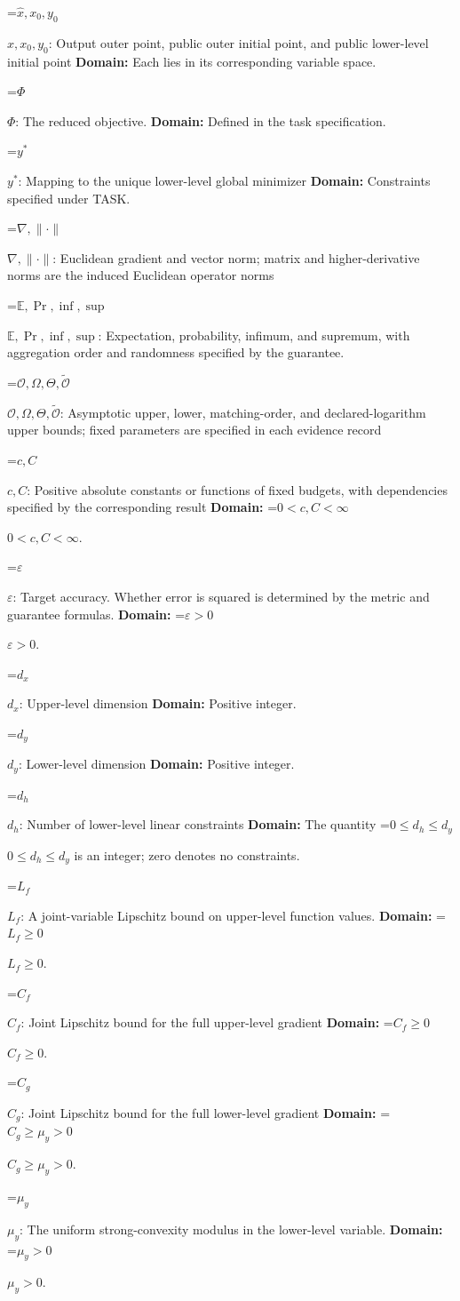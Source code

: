 \documentclass[10pt,a4paper]{article}
\newcommand{\AtlasMath}[1]{\par\begingroup\centering\setbox0=\hbox{$\displaystyle #1$}\ifdim\wd0>1.4\linewidth\typeout{ATLAS WIDE FORMULA: \the\wd0}\fi\ifdim\wd0>\linewidth\resizebox{\linewidth}{!}{\box0}\else\box0\fi\par\endgroup}
\newcommand{\AtlasInlineMath}[1]{\begingroup\setbox0=\hbox{$#1$}\ifdim\wd0>.4\linewidth\endgroup\AtlasMath{#1}\else\endgroup$#1$\fi}
\begin{document}
\AtlasInlineMath{\widehat x,x_0,y_0}: Output outer point, public outer initial point, and public lower-level initial point \textbf{Domain:} Each lies in its corresponding variable space.

\AtlasInlineMath{\Phi}: The reduced objective. \textbf{Domain:} Defined in the task specification.

\AtlasInlineMath{y^*}: Mapping to the unique lower-level global minimizer \textbf{Domain:} Constraints specified under TASK.

\AtlasInlineMath{\nabla,\|\cdot\|}: Euclidean gradient and vector norm; matrix and higher-derivative norms are the induced Euclidean operator norms

\AtlasInlineMath{\mathbb E,\Pr,\inf,\sup}: Expectation, probability, infimum, and supremum, with aggregation order and randomness specified by the guarantee.

\AtlasInlineMath{\mathcal O,\Omega,\Theta,\widetilde{\mathcal O}}: Asymptotic upper, lower, matching-order, and declared-logarithm upper bounds; fixed parameters are specified in each evidence record

\AtlasInlineMath{c,C}: Positive absolute constants or functions of fixed budgets, with dependencies specified by the corresponding result \textbf{Domain:} \AtlasInlineMath{0<c,C<\infty}.

\AtlasInlineMath{\varepsilon}: Target accuracy. Whether error is squared is determined by the metric and guarantee formulas. \textbf{Domain:} \AtlasInlineMath{\varepsilon>0}.

\AtlasInlineMath{d_x}: Upper-level dimension \textbf{Domain:} Positive integer.

\AtlasInlineMath{d_y}: Lower-level dimension \textbf{Domain:} Positive integer.

\AtlasInlineMath{d_h}: Number of lower-level linear constraints \textbf{Domain:} The quantity \AtlasInlineMath{0\le d_h\le d_y} is an integer; zero denotes no constraints.

\AtlasInlineMath{L_f}: A joint-variable Lipschitz bound on upper-level function values. \textbf{Domain:} \AtlasInlineMath{L_f\ge0}.

\AtlasInlineMath{C_f}: Joint Lipschitz bound for the full upper-level gradient \textbf{Domain:} \AtlasInlineMath{C_f\ge0}.

\AtlasInlineMath{C_g}: Joint Lipschitz bound for the full lower-level gradient \textbf{Domain:} \AtlasInlineMath{C_g\ge\mu_y>0}.

\AtlasInlineMath{\mu_y}: The uniform strong-convexity modulus in the lower-level variable. \textbf{Domain:} \AtlasInlineMath{\mu_y>0}.
\end{document}
